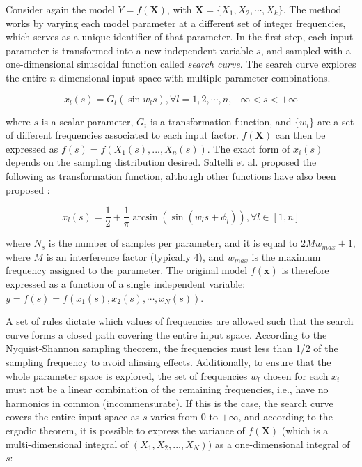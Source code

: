 \documentclass[12pt]{article}
\begin{document}
{Consider again the model $Y=f(\mathbf{X})$, with $\mathbf{X}=\{X_{1},X_{2},\cdots,X_{k}\}$. The method works by varying each model parameter at a different set of integer frequencies, which serves as a unique identifier of that parameter.
In the first step, each input parameter is transformed into a new independent variable $s$, and sampled with a one-dimensional sinusoidal function called \textit{search curve}. The search curve explores the entire $n$-dimensional input space with multiple parameter combinations.  

\begin{equation}
x_{l}(s)=G_{l}(\sin w_{l}s), \forall l=1,2,\cdots,n, -\infty<s<+\infty
\end{equation}

where $s$ is a scalar parameter, $G_{i}$ is a transformation function, and $\{w_{i}\}$ are a set of different frequencies associated to each input factor. $f(\mathbf{X})$ can then be expressed as $f(s)=f(X_{1}(s),...,X_{n}(s))$.  The exact form of $x_{i}(s)$ depends on the sampling distribution desired. Saltelli et al. \cite{SaltelliFAST} proposed the following as transformation function, although other functions have also been proposed \cite{Cukier1973,CUKIER19781}:

\begin{equation}
x_{l}(s)=\frac{1}{2}+\frac{1}{\pi} \arcsin(\sin(w_{l}s+\phi_{l})), \forall l \in [1,n]
\end{equation}

\vspace{0.5cm}
where $N_{s}$ is the number of samples per parameter, and it is equal to $2Mw_{max}+1$, where $M$ is an interference factor (typically 4), and $w_{max}$ is the maximum frequency assigned to the parameter. The original model $f(\mathbf{x})$ is therefore expressed as a function of a single independent variable: $y=f(s)=f(x_{1}(s),x_{2}(s),\cdots,x_{N}(s))$.

A set of rules dictate which values of frequencies are allowed such that the search curve forms a closed path covering the entire input space. According to the Nyquist-Shannon sampling theorem, the frequencies must less than 1/2 of the sampling frequency to avoid aliasing effects. Additionally, to ensure that the whole parameter space is explored, the set of frequencies $w_{l}$ chosen for each $x_{i}$ must not be a linear combination %
of the remaining frequencies, i.e., have no harmonics in common (incommensurate). 
If this is the case, the search curve covers the entire input space as $s$ varies from 0 to $+\infty$, and according to the ergodic theorem, it is possible to express the variance of $f(\mathbf{X})$ (which is a multi-dimensional integral of $(X_{1},X_{2},...,X_{N})$) as a one-dimensional integral of $s$:

}
\end{document}
